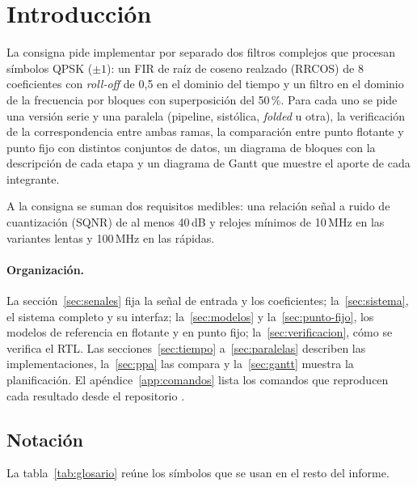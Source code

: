 \section{Introducción}\label{sec:intro}

La consigna pide implementar por separado dos filtros complejos que procesan símbolos QPSK ($\pm1$): un FIR de raíz de coseno realzado (RRCOS) de 8 coeficientes con \emph{roll-off} de 0,5 en el dominio del tiempo y un filtro en el dominio de la frecuencia por bloques con superposición del 50\,\%. Para cada uno se pide una versión serie y una paralela (pipeline, sistólica, \emph{folded} u otra), la verificación de la correspondencia entre ambas ramas, la comparación entre punto flotante y punto fijo con distintos conjuntos de datos, un diagrama de bloques con la descripción de cada etapa y un diagrama de Gantt que muestre el aporte de cada integrante.

A la consigna se suman dos requisitos medibles: una relación señal a ruido de cuantización (SQNR) de al menos 40\,dB y relojes mínimos de 10\,MHz en las variantes lentas y 100\,MHz en las rápidas.

\paragraph{Organización.} La sección~\ref{sec:senales} fija la señal de entrada y los coeficientes; la~\ref{sec:sistema}, el sistema completo y su interfaz; la~\ref{sec:modelos} y la~\ref{sec:punto-fijo}, los modelos de referencia en flotante y en punto fijo; la~\ref{sec:verificacion}, cómo se verifica el RTL. Las secciones~\ref{sec:tiempo} a~\ref{sec:paralelas} describen las implementaciones, la~\ref{sec:ppa} las compara y la~\ref{sec:gantt} muestra la planificación. El apéndice~\ref{app:comandos} lista los comandos que reproducen cada resultado desde el repositorio \repo.

\subsection{Notación}

La tabla~\ref{tab:glosario} reúne los símbolos que se usan en el resto del informe.

